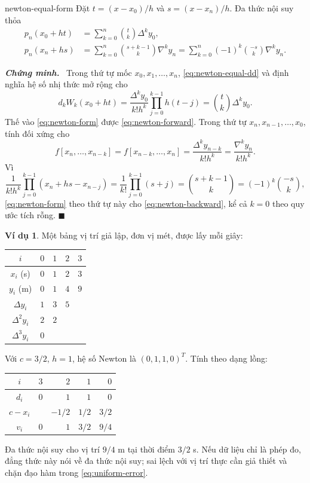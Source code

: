 \documentclass[12pt,a4paper,oneside]{book}
\numberwithin{algorithm}{chapter}
\theoremstyle{definition}
\newtheorem{vidu}{Ví dụ}[chapter]
\newenvironment{chungminh}{\par\medskip\noindent\textbf{\textit{\color{mainblue}Chứng minh.}}\ }{\hfill$\blacksquare$\par\medskip}
\begin{document}
\begin{dinhly}{}{newton-equal-form}
Đặt $t=(x-x_0)/h$ và $s=(x-x_n)/h$. Đa thức nội suy thỏa
\begin{align}
 p_n(x_0+ht)&=\sum_{k=0}^{n}\binom tk\Delta^ky_0,\label{eq:newton-forward}\\
 p_n(x_n+hs)&=\sum_{k=0}^{n}\binom{s+k-1}k\nabla^ky_n
 =\sum_{k=0}^{n}(-1)^k\binom{-s}k\nabla^ky_n.\label{eq:newton-backward}
\end{align}
\end{dinhly}
\begin{chungminh}
Trong thứ tự mốc $x_0,x_1,\ldots,x_n$, \eqref{eq:newton-equal-dd} và định nghĩa hệ số nhị thức mở rộng cho
\[
 d_kW_k(x_0+ht)
 =\frac{\Delta^ky_0}{k!h^k}\prod_{j=0}^{k-1}h(t-j)
 =\binom tk\Delta^ky_0.
\]
Thế vào \eqref{eq:newton-form} được \eqref{eq:newton-forward}. Trong thứ tự $x_n,x_{n-1},\ldots,x_0$, tính đối xứng cho
\[
 f[x_n,\ldots,x_{n-k}]=f[x_{n-k},\ldots,x_n]
 =\frac{\Delta^ky_{n-k}}{k!h^k}=\frac{\nabla^ky_n}{k!h^k}.
\]
Vì
\[
 \frac1{k!h^k}\prod_{j=0}^{k-1}(x_n+hs-x_{n-j})
 =\frac1{k!}\prod_{j=0}^{k-1}(s+j)
 =\binom{s+k-1}k=(-1)^k\binom{-s}k,
\]
\eqref{eq:newton-form} theo thứ tự này cho \eqref{eq:newton-backward}, kể cả $k=0$ theo quy ước tích rỗng.
\end{chungminh}

\begin{vidu}
Một bảng vị trí giả lập, đơn vị mét, được lấy mỗi giây:
\begin{center}
\begin{tabular}{c|rrrr}\toprule
$i$&$0$&$1$&$2$&$3$\\\midrule
$x_i$ (s)&$0$&$1$&$2$&$3$\\
$y_i$ (m)&$0$&$1$&$4$&$9$\\
$\Delta y_i$&$1$&$3$&$5$&\\
$\Delta^2y_i$&$2$&$2$&&\\
$\Delta^3y_i$&$0$&&&\\\bottomrule
\end{tabular}
\end{center}
Với $c=3/2$, $h=1$, hệ số Newton là $(0,1,1,0)^T$. Tính theo dạng lồng:
\begin{center}
\begin{tabular}{c|rrrr}\toprule
$i$&$3$&$2$&$1$&$0$\\\midrule
$d_i$&$0$&$1$&$1$&$0$\\
$c-x_i$&&$-1/2$&$1/2$&$3/2$\\
$v_i$&$0$&$1$&$3/2$&$9/4$\\\bottomrule
\end{tabular}
\end{center}
Đa thức nội suy cho vị trí $9/4$ m tại thời điểm $3/2$ s. Nếu dữ liệu chỉ là phép đo, đẳng thức này nói về đa thức nội suy; sai lệch với vị trí thực cần giả thiết và chặn đạo hàm trong \eqref{eq:uniform-error}.
\end{vidu}
\end{document}
